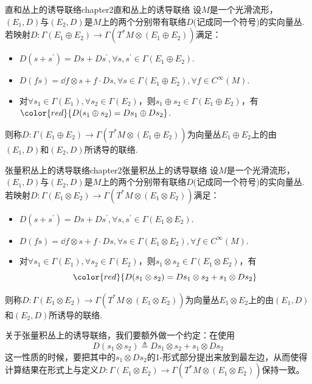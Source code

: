 \begin{mydef}{直和丛上的诱导联络}{chapter2直和丛上的诱导联络}
	设$M$是一个光滑流形，$(E_{1},D)$与$(E_{2},D)$是$M$上的两个分别带有联络$D$(记成同一个符号)的实向量丛. 若映射$D:\Gamma(E_{1}\oplus E_{2})\longrightarrow \Gamma(T^{\ast}M\otimes (E_{1}\oplus E_{2}))$满足：
	\begin{itemize}
		\item[(1)] $D(s +s^{\prime})=Ds  +Ds^{\prime},\forall s ,s^{\prime}\in \Gamma(E_{1}\oplus E_{2})$.
		\item[(2)] $D(f s )=\dd f\otimes s +f\cdot Ds ,\forall s \in \Gamma(E_{1}\oplus E_{2}),\forall f\in C^{\infty}(M)$.
		\item[(3)] 对$\forall s_{1}\in \Gamma(E_{1}),\forall s_{2}\in \Gamma(E_{2})$，则$s_{1}\oplus s_{2}\in \Gamma(E_{1}\oplus E_{2})$，有$	{\color{red}{D(s_{1}\oplus s_{2})= Ds_{1}\oplus Ds_{2}}}$.
	\end{itemize}
	则称$D:\Gamma(E_{1}\oplus E_{2})\longrightarrow \Gamma(T^{\ast}M\otimes (E_{1}\oplus E_{2}))$为向量丛$E_{1}\oplus E_{2}$上的由$(E_{1},D)$和$(E_{2},D)$所诱导的联络.
\end{mydef}

\begin{mydef}{张量积丛上的诱导联络}{chapter2张量积丛上的诱导联络}
	设$M$是一个光滑流形，$(E_{1},D)$与$(E_{2},D)$是$M$上的两个分别带有联络$D$(记成同一个符号)的实向量丛. 若映射$D:\Gamma(E_{1}\otimes E_{2})\longrightarrow \Gamma(T^{\ast}M\otimes (E_{1}\otimes E_{2}))$满足：
	\begin{itemize}
		\item[(1)] $D(s +s^{\prime})=Ds  +Ds^{\prime},\forall s ,s^{\prime}\in \Gamma(E_{1}\otimes E_{2})$.
		\item[(2)] $D(f s )=\dd f\otimes s +f\cdot Ds ,\forall s \in \Gamma(E_{1}\otimes E_{2}),\forall f\in C^{\infty}(M)$.
		\item[(3)] 对$\forall s_{1}\in \Gamma(E_{1}),\forall s_{2}\in \Gamma(E_{2})$，则$s_{1}\otimes s_{2}\in \Gamma(E_{1}\otimes E_{2})$，有
				\[
				{\color{red}{D(s_{1}\otimes s_{2})= Ds_{1}\otimes s_{2}+ s_{1}\otimes Ds_{2}}}
				\] 
	\end{itemize}
	则称$D:\Gamma(E_{1}\otimes E_{2})\longrightarrow \Gamma(T^{\ast}M\otimes (E_{1}\otimes E_{2}))$为向量丛$E_{1}\otimes E_{2}$上的由$(E_{1},D)$和$(E_{2},D)$所诱导的联络.
\end{mydef}

\begin{remark}
	关于张量积丛上的诱导联络，我们要额外做一个约定：在使用
	\[
	D(s_{1}\otimes s_{2})\triangleq Ds_{1}\otimes s_{2}+ s_{1}\otimes Ds_{2}
	\]
	这一性质的时候，要把其中的$s_{1}\otimes Ds_{2}$的1-形式部分提出来放到最左边，从而使得计算结果在形式上与定义$D:\Gamma(E_{1}\otimes E_{2})\longrightarrow \Gamma(T^{\ast}M\otimes (E_{1}\otimes E_{2}))$保持一致。
\end{remark}

